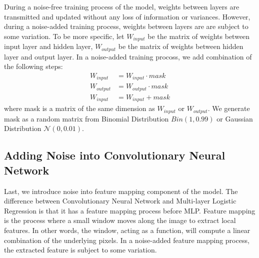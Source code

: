During a noise-free training process of the model, weights between layers
are transmitted and updated without any loss of information or variances.
However, during a noise-added training process, weights between layers are
are subject to some variation.
To be more specific, let $W_{input}$ be the matrix of weights between
input layer and hidden layer, $W_{output}$ be the matrix of weights
between hidden layer and output layer. In a noise-added training procoss,
we add combination of the following steps:
\begin{align*}
W_{input} & = W_{input} \cdot mask \\
W_{output} & = W_{output} \cdot mask \\
W_{input} & = W_{input} + mask
\end{align*}
where mask is a matrix of the same dimension as $W_{input}$ or $W_{output}$.
We generate mask as a random matrix from Binomial Distribution
$Bin(1,0.99)$ or Gaussian Distribution $\mathcal{N}(0, 0.01)$.

\subsection{Adding Noise into Convolutionary Neural Network}
Last, we introduce noise into feature mapping component of
the model. The difference between Convolutionary Neural Network and
Multi-layer Logistic Regression is that it has a feature mapping process
before MLP. Feature mapping is the process where a small window moves along
the image to extract local features. In other words, the window, acting as
a function, will compute a linear combination of the underlying pixels.
In a noise-added feature mapping process, the extracted feature is subject
to some variation.
